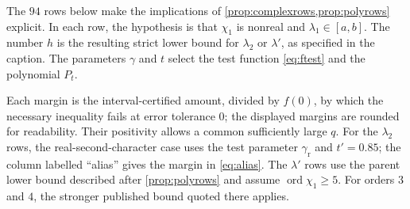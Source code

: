 \documentclass[11pt]{amsart}
\numberwithin{equation}{section}
\theoremstyle{plain}
\theoremstyle{definition}
\theoremstyle{remark}
\newcommand{\1}{\mathbf{1}}
\DeclareMathOperator{\ord}{ord}
\begin{document}
The $94$ rows below make the implications of \cref{prop:complexrows,prop:polyrows}
explicit. In each row, the hypothesis is that $\chi_1$ is nonreal and
$\lambda_1\in[a,b]$. The number $h$ is the resulting strict lower bound for
$\lambda_2$ or $\lambda'$, as specified in the caption. The parameters $\gamma$ and
$t$ select the test function \eqref{eq:ftest} and the polynomial $P_t$.

Each margin is the interval-certified amount, divided by $f(0)$, by which the necessary
inequality fails at error tolerance $0$; the displayed margins are rounded for
readability. Their positivity allows a common sufficiently large $q$.
For the $\lambda_2$ rows, the real-second-character case uses the test parameter $\gamma_{\mathrm r}$ and $t'=0.85$;
the column labelled ``alias'' gives the margin in \eqref{eq:alias}.
The $\lambda'$ rows use the parent lower bound described after \cref{prop:polyrows}
and assume $\ord\chi_1\ge5$. For orders $3$ and $4$, the stronger published bound
quoted there applies.
\end{document}
